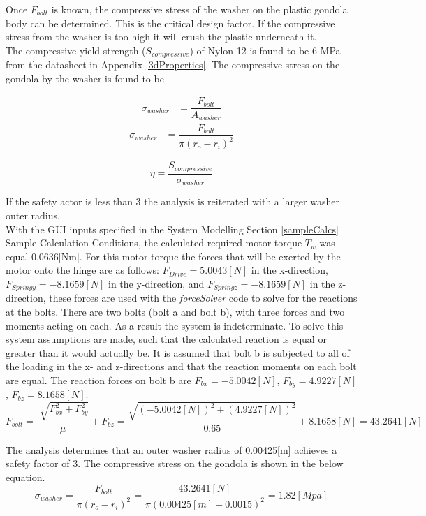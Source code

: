 \documentclass[../main.tex]{subfiles}
\begin{document}
Once $F_{bolt}$ is known, the compressive stress of the washer on the plastic gondola body can be determined. This is the critical design factor. If the compressive stress from the washer is too high it will crush the plastic underneath it.\\

The compressive yield strength ($S_{compressive}$) of Nylon 12  is found to be 6 MPa from the datasheet in Appendix \ref{3dProperties}. The compressive stress on the gondola by the washer is found to be 

\begin{align*}
\sigma _{washer} &= \dfrac{F_{bolt}}{A_{washer}}
\end{align*}
\begin{align}
\sigma _{washer} &= \dfrac{F_{bolt}}{\pi (r_o - r_i)^2}
\end{align}

\begin{equation}
\eta = \dfrac{S_{compressive}}{\sigma _{washer}}
\end{equation}

If the safety actor is less than 3 the analysis is reiterated with a larger washer outer radius.\\

With the GUI inputs specified in the System Modelling Section \ref{sampleCalcs} Sample Calculation Conditions, the calculated required motor torque $T_w$ was equal 0.0636[Nm]. For this motor torque the forces that will be exerted by the motor onto the hinge are as follows: $F_{Drive} = 5.0043[N]$ in the x-direction, $F_{Springy} = -8.1659[N]$ in the y-direction, and $F_{Springz} = -8.1659[N]$ in the z-direction, these forces are used with the \textit{forceSolver} code to solve for the reactions at the bolts. There are two bolts (bolt a and bolt b), with three forces and two moments acting on each. As a result the system is indeterminate. To solve this system assumptions are made, such that the calculated reaction is equal or greater than it would actually be. It is assumed that bolt b is subjected to all of the loading in the x- and z-directions and that the reaction moments on each bolt are equal. The reaction forces on bolt b are $F_{bx} = -5.0042[N]$, $F_{by} = 4.9227[N]$, $F_{bz} = 8.1658[N]$. 
\begin{equation*}
F_{bolt} = \dfrac{\sqrt[]{F_{bx}^2 + F_{by}^2}}{\mu} + F_{bz} = \dfrac{\sqrt{(-5.0042[N])^2 + (4.9227[N])^2}}{0.65} + 8.1658[N] = 43.2641[N]
\end{equation*}

The analysis determines that an outer washer radius of 0.00425[m] achieves a safety factor of 3. The compressive stress on the gondola is shown in the below equation. 
\begin{equation*}
\sigma _{washer} = \dfrac{F_{bolt}}{\pi (r_o - r_i)^2} = \dfrac{43.2641[N]}{\pi (0.00425[m] - 0.0015)^2}  = 1.82[Mpa] 
\end{equation*}
\end{document}
